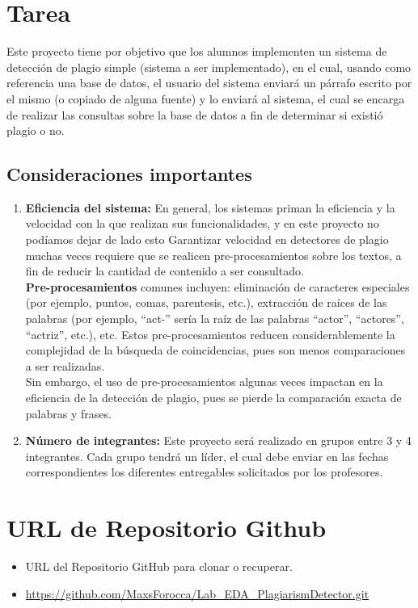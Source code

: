 \section{Tarea}

Este proyecto tiene por objetivo que los alumnos implementen un sistema de detección de
plagio simple (sistema a ser implementado), en el cual, usando como referencia una base
de datos, el usuario del sistema enviará un párrafo escrito por el mismo (o copiado de
alguna fuente) y lo enviará al sistema, el cual se encarga de realizar las consultas sobre la base de datos a fin de determinar si existió plagio o no.
\subsection*{Consideraciones importantes}
\begin{enumerate}
    \item \textbf{Eficiencia del sistema:} En general, los sistemas priman la eficiencia y la velocidad con la que realizan sus funcionalidades, y en este proyecto no podíamos dejar de lado esto Garantizar velocidad en detectores de plagio muchas veces requiere que se realicen
pre-procesamientos sobre los textos, a fin de reducir la cantidad de contenido a ser
consultado.\\

\textbf{Pre-procesamientos} comunes incluyen: eliminación de caracteres especiales (por
ejemplo, puntos, comas, parentesis, etc.), extracción de raíces de las palabras (por
ejemplo, “act-” sería la raíz de las palabras “actor”, “actores”, “actriz”, etc.), etc. Estos
pre-procesamientos reducen considerablemente la complejidad de la búsqueda de
coincidencias, pues son menos comparaciones a ser realizadas.\\

Sin embargo, el uso de pre-procesamientos algunas veces impactan en la eficiencia
de la detección de plagio, pues se pierde la comparación exacta de palabras y
frases.
    \item  \textbf{Número de integrantes:} Este proyecto será realizado en grupos entre 3 y 4
integrantes. Cada grupo tendrá un líder, el cual debe enviar en las fechas
correspondientes los diferentes entregables solicitados por los profesores.

\end{enumerate}
\section{URL de Repositorio Github}
\begin{itemize}
    \item URL del Repositorio GitHub para clonar o recuperar.
    \item \url{https://github.com/MaxsForocca/Lab_EDA_PlagiarismDetector.git}
\end{itemize}


